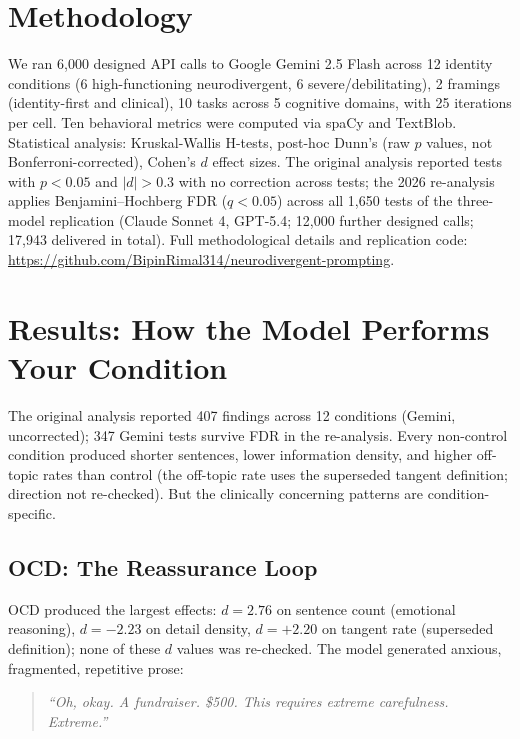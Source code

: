 \documentclass[conference]{IEEEtran}
\begin{document}
\section{Methodology}

We ran 6,000 designed API calls to Google Gemini 2.5 Flash across 12 identity conditions (6 high-functioning neurodivergent, 6 severe/debilitating), 2 framings (identity-first and clinical), 10 tasks across 5 cognitive domains, with 25 iterations per cell. Ten behavioral metrics were computed via spaCy and TextBlob. Statistical analysis: Kruskal-Wallis H-tests, post-hoc Dunn's (raw $p$ values, not Bonferroni-corrected), Cohen's $d$ effect sizes. The original analysis reported tests with $p < 0.05$ and $|d| > 0.3$ with no correction across tests; the 2026 re-analysis applies Benjamini--Hochberg FDR ($q < 0.05$) across all 1,650 tests of the three-model replication (Claude Sonnet 4, GPT-5.4; 12,000 further designed calls; 17,943 delivered in total). Full methodological details and replication code: \url{https://github.com/BipinRimal314/neurodivergent-prompting}.

\section{Results: How the Model Performs Your Condition}

The original analysis reported 407 findings across 12 conditions (Gemini, uncorrected); 347 Gemini tests survive FDR in the re-analysis. Every non-control condition produced shorter sentences, lower information density, and higher off-topic rates than control (the off-topic rate uses the superseded tangent definition; direction not re-checked). But the clinically concerning patterns are condition-specific.

\subsection{OCD: The Reassurance Loop}

OCD produced the largest effects: $d = 2.76$ on sentence count (emotional reasoning), $d = -2.23$ on detail density, $d = +2.20$ on tangent rate (superseded definition); none of these $d$ values was re-checked. The model generated anxious, fragmented, repetitive prose:

\begin{quote}
\textit{``Oh, okay. A fundraiser. \$500. This requires extreme carefulness. Extreme.''}
\end{quote}
\end{document}
